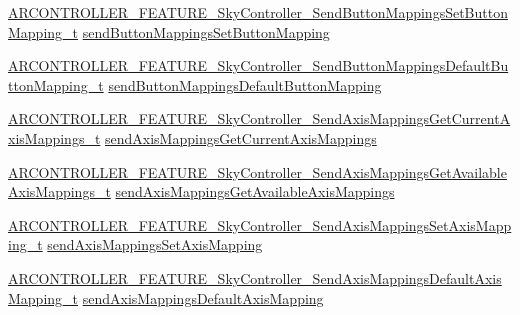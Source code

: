 \begin{DoxyCompactItemize}
\item 
\hyperlink{_a_r_c_o_n_t_r_o_l_l_e_r___feature_8h_a3597487ab14eb584076247ba8cb27a48}{A\+R\+C\+O\+N\+T\+R\+O\+L\+L\+E\+R\+\_\+\+F\+E\+A\+T\+U\+R\+E\+\_\+\+Sky\+Controller\+\_\+\+Send\+Button\+Mappings\+Set\+Button\+Mapping\+\_\+t} \hyperlink{struct_a_r_c_o_n_t_r_o_l_l_e_r___f_e_a_t_u_r_e___sky_controller__t_a64ead2601873640b344e38b71d7f04e2}{send\+Button\+Mappings\+Set\+Button\+Mapping}
\item 
\hyperlink{_a_r_c_o_n_t_r_o_l_l_e_r___feature_8h_ab6c5f64c014009894a0aa6867c20cfaf}{A\+R\+C\+O\+N\+T\+R\+O\+L\+L\+E\+R\+\_\+\+F\+E\+A\+T\+U\+R\+E\+\_\+\+Sky\+Controller\+\_\+\+Send\+Button\+Mappings\+Default\+Button\+Mapping\+\_\+t} \hyperlink{struct_a_r_c_o_n_t_r_o_l_l_e_r___f_e_a_t_u_r_e___sky_controller__t_a6999fc50afc8a36b1a252aa40cecf290}{send\+Button\+Mappings\+Default\+Button\+Mapping}
\item 
\hyperlink{_a_r_c_o_n_t_r_o_l_l_e_r___feature_8h_a401549114ba9e849cf8941def2b62b33}{A\+R\+C\+O\+N\+T\+R\+O\+L\+L\+E\+R\+\_\+\+F\+E\+A\+T\+U\+R\+E\+\_\+\+Sky\+Controller\+\_\+\+Send\+Axis\+Mappings\+Get\+Current\+Axis\+Mappings\+\_\+t} \hyperlink{struct_a_r_c_o_n_t_r_o_l_l_e_r___f_e_a_t_u_r_e___sky_controller__t_a81e3d62f97a86ed892b274bab5c18556}{send\+Axis\+Mappings\+Get\+Current\+Axis\+Mappings}
\item 
\hyperlink{_a_r_c_o_n_t_r_o_l_l_e_r___feature_8h_af3f673918063494ca7e5e155dc17ca6e}{A\+R\+C\+O\+N\+T\+R\+O\+L\+L\+E\+R\+\_\+\+F\+E\+A\+T\+U\+R\+E\+\_\+\+Sky\+Controller\+\_\+\+Send\+Axis\+Mappings\+Get\+Available\+Axis\+Mappings\+\_\+t} \hyperlink{struct_a_r_c_o_n_t_r_o_l_l_e_r___f_e_a_t_u_r_e___sky_controller__t_a2d41aa24f9d5efc262a94a55ea749dce}{send\+Axis\+Mappings\+Get\+Available\+Axis\+Mappings}
\item 
\hyperlink{_a_r_c_o_n_t_r_o_l_l_e_r___feature_8h_aeaf46c01b943cfc925b77197b126fab1}{A\+R\+C\+O\+N\+T\+R\+O\+L\+L\+E\+R\+\_\+\+F\+E\+A\+T\+U\+R\+E\+\_\+\+Sky\+Controller\+\_\+\+Send\+Axis\+Mappings\+Set\+Axis\+Mapping\+\_\+t} \hyperlink{struct_a_r_c_o_n_t_r_o_l_l_e_r___f_e_a_t_u_r_e___sky_controller__t_a93ba10eb191036deea55f29f75420e95}{send\+Axis\+Mappings\+Set\+Axis\+Mapping}
\item 
\hyperlink{_a_r_c_o_n_t_r_o_l_l_e_r___feature_8h_aac1227b5d0b390dde40d2f66e29dcd82}{A\+R\+C\+O\+N\+T\+R\+O\+L\+L\+E\+R\+\_\+\+F\+E\+A\+T\+U\+R\+E\+\_\+\+Sky\+Controller\+\_\+\+Send\+Axis\+Mappings\+Default\+Axis\+Mapping\+\_\+t} \hyperlink{struct_a_r_c_o_n_t_r_o_l_l_e_r___f_e_a_t_u_r_e___sky_controller__t_ade165e907e3c265dc077226a2d21fdd6}{send\+Axis\+Mappings\+Default\+Axis\+Mapping}

\end{DoxyCompactItemize}
